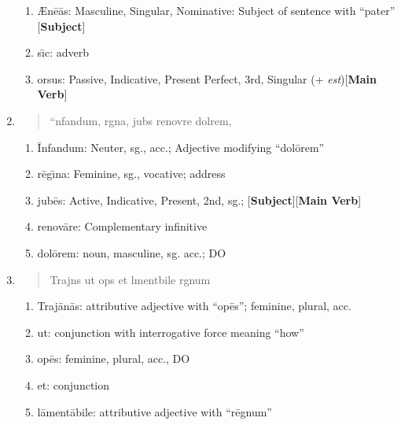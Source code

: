 \documentclass[]{article}
\newcommand{\latify}[1]{
        \Large
        \begin{verse}
          \begin{metrica}
          {#1}\\
          \end{metrica}
        \end{verse}
        \normalsize
}
\begin{document}
\begin{enumerate}
\begin{enumerate}
	\item {\AE}n\=e\=as: Masculine, Singular, Nominative:  Subject of sentence with ``pater''  [\textbf{Subject}]
	
	\item s\={\i}c:  adverb
	
	\item orsus: Passive, Indicative, Present Perfect, 3rd, Singular (+ \emph{est})[\textbf{Main Verb}]
	
	
\end{enumerate}

\item \latify{``{}nfandum, r{}g{\macron {\i}}na, jub{\macron {e}}s renov{\macron {a}}re dol{\macron {o}}rem,}
\begin{enumerate}

	\item \=Infandum:  Neuter, sg., acc.; Adjective modifying ``dol\={o}rem''

	\item r\=eg\={\i}na:  Feminine, sg., vocative; address

	\item jub\=es:  Active, Indicative, Present, 2nd, sg.;  [\textbf{Subject}][\textbf{Main Verb}]

	\item renov\=are: Complementary infinitive

	\item dol\=orem:  noun, masculine, sg. acc.; DO

\end{enumerate}


\item \latify{Traj{}n{\macron {a}}s ut op{}s et l{\macron {a}}ment{\macron {a}}bile r{\macron {e}}gnum}
\begin{enumerate}

	\item Traj\=an\=as:  attributive adjective with ``op\={e}s''; feminine, plural, acc.

	\item ut:  conjunction with interrogative force meaning ``how''

	\item op\={e}s:   feminine, plural, acc., DO

	\item et: conjunction

	\item l\={a}ment\={a}bile: attributive adjective with ``r\={e}gnum''


\end{enumerate}
\end{enumerate}
\end{document}
